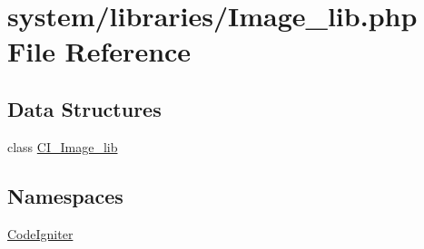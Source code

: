 \hypertarget{_image__lib_8php}{}\section{system/libraries/\+Image\+\_\+lib.php File Reference}
\label{_image__lib_8php}
\subsection*{Data Structures}
\begin{DoxyCompactItemize}
\item 
class \mbox{\hyperlink{class_c_i___image__lib}{C\+I\+\_\+\+Image\+\_\+lib}}
\end{DoxyCompactItemize}
\subsection*{Namespaces}
\begin{DoxyCompactItemize}
\item 
 \mbox{\hyperlink{namespace_code_igniter}{Code\+Igniter}}
\end{DoxyCompactItemize}
